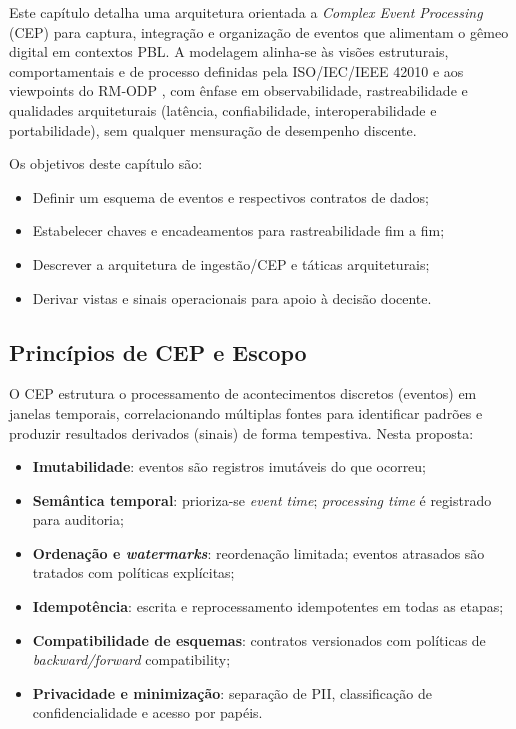 Este capítulo detalha uma arquitetura orientada a \textit{Complex Event Processing} (CEP) para captura, integração e organização de eventos que alimentam o gêmeo digital em contextos PBL. A modelagem alinha-se às visões estruturais, comportamentais e de processo definidas pela ISO/IEC/IEEE 42010 \cite{iso42010} e aos viewpoints do RM‑ODP \cite{iso10746}, com ênfase em observabilidade, rastreabilidade e qualidades arquiteturais (latência, confiabilidade, interoperabilidade e portabilidade), sem qualquer mensuração de desempenho discente.

Os objetivos deste capítulo são:
\begin{itemize}
  \item Definir um esquema de eventos e respectivos contratos de dados;
  \item Estabelecer chaves e encadeamentos para rastreabilidade fim a fim;
  \item Descrever a arquitetura de ingestão/CEP e táticas arquiteturais;
  \item Derivar vistas e sinais operacionais para apoio à decisão docente.
\end{itemize}

\subsection{Princípios de CEP e Escopo}

O CEP estrutura o processamento de acontecimentos discretos (eventos) em janelas temporais, correlacionando múltiplas fontes para identificar padrões e produzir resultados derivados (sinais) de forma tempestiva. Nesta proposta:
\begin{itemize}
  \item \textbf{Imutabilidade}: eventos são registros imutáveis do que ocorreu;
  \item \textbf{Semântica temporal}: prioriza-se \textit{event time}; \textit{processing time} é registrado para auditoria;
  \item \textbf{Ordenação e \textit{watermarks}}: reordenação limitada; eventos atrasados são tratados com políticas explícitas;
  \item \textbf{Idempotência}: escrita e reprocessamento idempotentes em todas as etapas;
  \item \textbf{Compatibilidade de esquemas}: contratos versionados com políticas de \textit{backward/forward} compatibility;
  \item \textbf{Privacidade e minimização}: separação de PII, classificação de confidencialidade e acesso por papéis.
\end{itemize}

